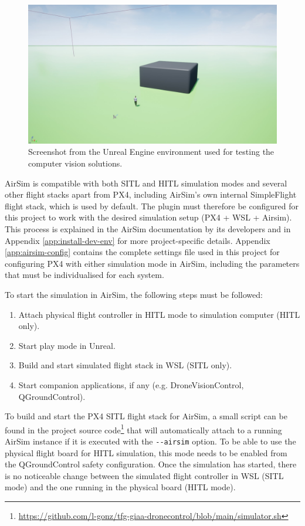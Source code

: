 

\begin{figure}
  \centering
  \includegraphics[width=\textwidth,keepaspectratio]{img/unreal-env.jpg}
  \caption{Screenshot from the Unreal Engine environment used for testing the computer vision solutions.}
  \label{fig:unreal-env}
\end{figure}


AirSim is compatible with both SITL and HITL simulation modes and several other flight stacks apart from PX4, including AirSim’s own internal SimpleFlight flight stack, which is used by default. 
The plugin must therefore be configured for this project to work with the desired simulation setup (PX4 + WSL + Airsim).
This process is explained in the AirSim documentation \cite{build-airsim} by its developers and in Appendix \ref{app:install-dev-env} for more project-specific details.
Appendix \ref{app:airsim-config} contains the complete settings file used in this project for configuring PX4 with either simulation mode in AirSim, including the parameters that must be individualised for each system.


To start the simulation in AirSim, the following steps must be followed:
\begin{enumerate}
 \item Attach physical flight controller in HITL mode to simulation computer (HITL only).
 \item Start play mode in Unreal.
 \item Build and start simulated flight stack in WSL (SITL only).
 \item Start companion applications, if any (e.g. DroneVisionControl, QGroundControl).
\end{enumerate}

To build and start the PX4 SITL flight stack for AirSim, a small script can be found in the project source code\footnote{\url{https://github.com/l-gonz/tfg-giaa-dronecontrol/blob/main/simulator.sh}} that will automatically attach to a running AirSim instance if it is executed with the \texttt{-{}-airsim} option.
To be able to use the physical flight board for HITL simulation, this mode needs to be enabled from the QGroundControl safety configuration.
Once the simulation has started, there is no noticeable change between the simulated flight controller in WSL (SITL mode) and the one running in the physical board (HITL mode).
